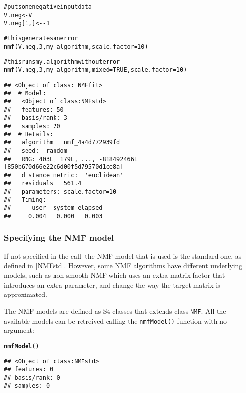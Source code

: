 \documentclass[a4paper]{article}\usepackage{graphicx, color}
\makeatletter
\newcommand{\hlfunctioncall}[1]{\textcolor[rgb]{0.501960784313725,0,0.329411764705882}{\textbf{#1}}}%
\newcommand{\hlcomment}[1]{\textcolor[rgb]{0.180392156862745,0.6,0.341176470588235}{#1}}%
\newenvironment{kframe}{%
 \def\at@end@of@kframe{}%
 \ifinner\ifhmode%
  \def\at@end@of@kframe{\end{minipage}}%
  \begin{minipage}{\columnwidth}%
 \fi\fi%
 \def\FrameCommand##1{\hskip\@totalleftmargin \hskip-\fboxsep
 \colorbox{shadecolor}{##1}\hskip-\fboxsep
     \hskip-\linewidth \hskip-\@totalleftmargin \hskip\columnwidth}%
 \MakeFramed {\advance\hsize-\width
   \@totalleftmargin\z@ \linewidth\hsize
   \@setminipage}}%
 {\par\unskip\endMakeFramed%
 \at@end@of@kframe}
\newenvironment{knitrout}{}{} %
\let\code=\texttt
\renewcommand{\cite}[1]{\parencite{#1}}
\makeatother
\begin{document}
\begin{knitrout}
\color{fgcolor}\begin{kframe}
\begin{alltt}
\hlcomment{# put some negative input data}
V.neg <- V
V.neg[1, ] <- -1

\hlcomment{# this generates an error}
\hlfunctioncall{nmf}(V.neg, 3, my.algorithm, scale.factor = 10)
\end{alltt}


{\ttfamily\noindent\bfseries\color{errorcolor}{\#\# Error: NMF::nmf - Input matrix x contains some negative entries.}}\begin{alltt}

\hlcomment{# this runs my.algorithm without error}
\hlfunctioncall{nmf}(V.neg, 3, my.algorithm, mixed = TRUE, scale.factor = 10)
\end{alltt}
\begin{verbatim}
## <Object of class: NMFfit>
##  # Model:
##   <Object of class:NMFstd>
##   features: 50 
##   basis/rank: 3 
##   samples: 20 
##  # Details:
##   algorithm:  nmf_4a4d772939fd 
##   seed:  random 
##   RNG: 403L, 179L, ..., -818492466L [850b670d66e22c6d00f5d79570d1ce8a]
##   distance metric:  'euclidean' 
##   residuals:  561.4 
##   parameters: scale.factor=10 
##   Timing:
##      user  system elapsed 
##     0.004   0.000   0.003
\end{verbatim}
\end{kframe}
\end{knitrout}


\subsubsection{Specifying the NMF model}
If not specified in the call, the NMF model that is used is the standard one, as defined in \cref{NMFstd}. 
However, some NMF algorithms have different underlying models, such as non-smooth NMF \cite{Pascual-Montano2006} which uses an extra matrix factor that introduces an extra parameter, and change the way the target matrix is approximated.

The NMF models are defined as S4 classes that extends class \code{NMF}. All the available models can be retreived calling the \code{nmfModel()} function with no 
argument:

\begin{knitrout}
\color{fgcolor}\begin{kframe}
\begin{alltt}
\hlfunctioncall{nmfModel}()
\end{alltt}
\begin{verbatim}
## <Object of class:NMFstd>
## features: 0 
## basis/rank: 0 
## samples: 0
\end{verbatim}
\end{kframe}
\end{knitrout}
\end{document}
